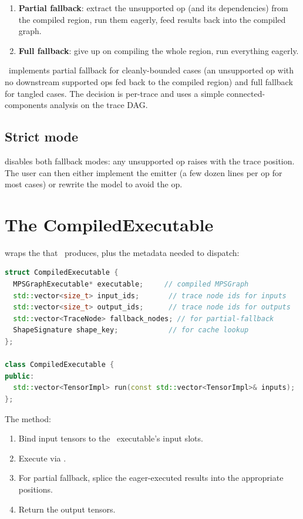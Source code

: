 \begin{enumerate}
  \item \textbf{Partial fallback}: extract the unsupported op (and
    its dependencies) from the compiled region, run them eagerly,
    feed results back into the compiled graph.
  \item \textbf{Full fallback}: give up on compiling the whole
    region, run everything eagerly.
\end{enumerate}

\Lucid\ implements partial fallback for cleanly-bounded cases
(an unsupported op with no downstream supported ops fed back to
the compiled region) and full fallback for tangled cases. The
decision is per-trace and uses a simple connected-components
analysis on the trace DAG.

\subsection{Strict mode}
\label{ssec:mps_builder:strict_mode}

 disables both fallback
modes: any unsupported op raises
 with
the trace position. The user can then either implement the
emitter (a few dozen lines per op for most cases) or rewrite the
model to avoid the op.

\section{The CompiledExecutable}
\label{sec:mps_builder:executable}

 wraps the  that
\MPSGraph\ produces, plus the metadata needed to dispatch:

\begin{lstlisting}[style=lucidcpp,language=C++]
struct CompiledExecutable {
  MPSGraphExecutable* executable;     // compiled MPSGraph
  std::vector<size_t> input_ids;       // trace node ids for inputs
  std::vector<size_t> output_ids;      // trace node ids for outputs
  std::vector<TraceNode> fallback_nodes; // for partial-fallback
  ShapeSignature shape_key;            // for cache lookup
};

class CompiledExecutable {
public:
  std::vector<TensorImpl> run(const std::vector<TensorImpl>& inputs);
};
\end{lstlisting}

The  method:
\begin{enumerate}
  \item Bind input tensors to the \MPSGraph\ executable's input
    slots.
  \item Execute via .
  \item For partial fallback, splice the eager-executed results
    into the appropriate positions.
  \item Return the output tensors.
\end{enumerate}

